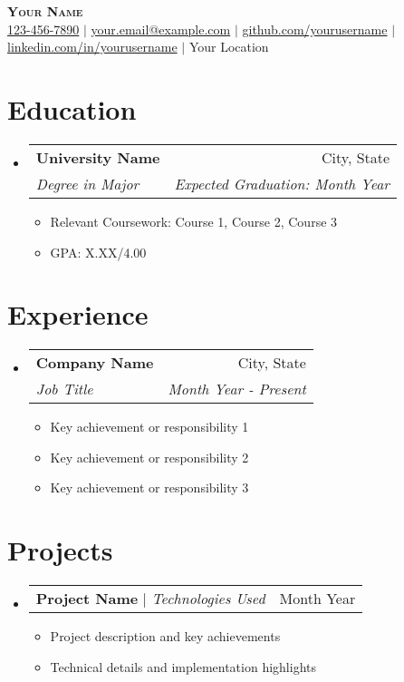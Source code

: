 \documentclass[letterpaper,11pt]{article}
\makeatletter
\newcommand{\resumeItem}[1]{
  \item\small{
    {#1 \vspace{-2pt}}
  }
}
\newcommand{\resumeSubheading}[4]{
  \vspace{-2pt}\item
    \begin{tabular*}{0.97\textwidth}[t]{l@{\extracolsep{\fill}}r}
      \textbf{#1} & #2 \\
      \textit{\small#3} & \textit{\small #4} \\
    \end{tabular*}\vspace{-7pt}
}
\newcommand{\resumeProjectHeading}[2]{
    \item
    \begin{tabular*}{0.97\textwidth}{l@{\extracolsep{\fill}}r}
      \small#1 & #2 \\
    \end{tabular*}\vspace{-7pt}
}
\newcommand{\resumeSubHeadingListStart}{\begin{itemize}[leftmargin=0.15in, label={}]}
\newcommand{\resumeSubHeadingListEnd}{\end{itemize}}
\newcommand{\resumeItemListStart}{\begin{itemize}}
\newcommand{\resumeItemListEnd}{\end{itemize}\vspace{-5pt}}
\makeatother
\begin{document}
\begin{center}
    \textbf{\Huge \scshape Your Name} \\ \vspace{3pt}
    \small
    \faMobile \hspace{.5pt} \href{tel:+1234567890}{123-456-7890} $|$ 
    \faEnvelope \hspace{.5pt} \href{mailto:your.email@example.com}{your.email@example.com} $|$ 
    \faGithub \hspace{.5pt} \href{https://github.com/yourusername}{github.com/yourusername} $|$ 
    \faLinkedin \hspace{.5pt} \href{https://linkedin.com/in/yourusername}{linkedin.com/in/yourusername} $|$ 
    \faMapMarker \hspace{.5pt} Your Location
\end{center}

\section{Education}
  \resumeSubHeadingListStart
    \resumeSubheading
      {University Name}{City, State}
      {Degree in Major}{Expected Graduation: Month Year}
      \resumeItemListStart
        \resumeItem{Relevant Coursework: Course 1, Course 2, Course 3}
        \resumeItem{GPA: X.XX/4.00}
      \resumeItemListEnd
  \resumeSubHeadingListEnd

\section{Experience}
  \resumeSubHeadingListStart
    \resumeSubheading
      {Company Name}{City, State}
      {Job Title}{Month Year - Present}
      \resumeItemListStart
        \resumeItem{Key achievement or responsibility 1}
        \resumeItem{Key achievement or responsibility 2}
        \resumeItem{Key achievement or responsibility 3}
      \resumeItemListEnd
  \resumeSubHeadingListEnd

\section{Projects}
  \resumeSubHeadingListStart
    \resumeProjectHeading
      {\textbf{Project Name} $|$ \emph{Technologies Used}}{Month Year}
      \resumeItemListStart
        \resumeItem{Project description and key achievements}
        \resumeItem{Technical details and implementation highlights}
      \resumeItemListEnd
  \resumeSubHeadingListEnd
\end{document}

